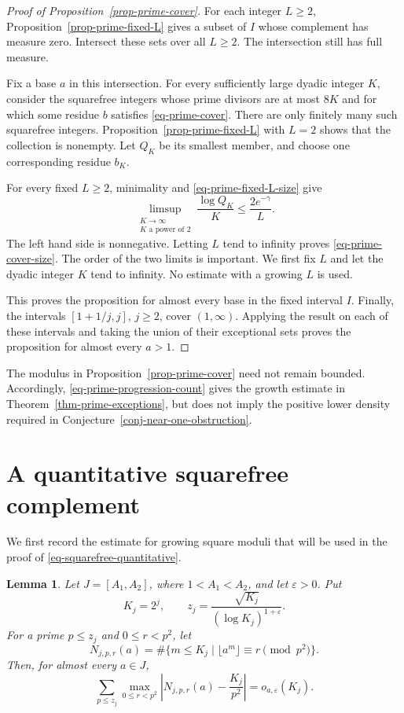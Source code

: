 \documentclass[11pt,reqno]{amsart}
\numberwithin{equation}{section}
\newtheorem{lemma}[theorem]{Lemma}
\begin{document}
\begin{proof}[Proof of Proposition~\ref{prop-prime-cover}]
For each integer $L\ge2$, Proposition~\ref{prop-prime-fixed-L} gives a subset of $I$ whose complement has measure zero. Intersect these sets over all $L\ge2$. The intersection still has full measure.

Fix a base $a$ in this intersection. For every sufficiently large dyadic integer $K$, consider the squarefree integers whose prime divisors are at most $8K$ and for which some residue $b$ satisfies \eqref{eq-prime-cover}. There are only finitely many such squarefree integers. Proposition~\ref{prop-prime-fixed-L} with $L=2$ shows that the collection is nonempty. Let $Q_K$ be its smallest member, and choose one corresponding residue $b_K$.

For every fixed $L\ge2$, minimality and \eqref{eq-prime-fixed-L-size} give
\[
 \limsup_{\substack{K\to\infty\\K\text{ a power of }2}}
 \frac{\log Q_K}{K}
 \le\frac{2e^{-\gamma}}L.
\]
The left hand side is nonnegative. Letting $L$ tend to infinity proves \eqref{eq-prime-cover-size}. The order of the two limits is important. We first fix $L$ and let the dyadic integer $K$ tend to infinity. No estimate with a growing $L$ is used.

This proves the proposition for almost every base in the fixed interval $I$. Finally, the intervals $[1+1/j,j]$, $j\ge2$, cover $(1,\infty)$. Applying the result on each of these intervals and taking the union of their exceptional sets proves the proposition for almost every $a>1$.
\end{proof}

The modulus in Proposition~\ref{prop-prime-cover} need not remain bounded. Accordingly, \eqref{eq-prime-progression-count} gives the growth estimate in Theorem~\ref{thm-prime-exceptions}, but does not imply the positive lower density required in Conjecture~\ref{conj-near-one-obstruction}.

\section{A quantitative squarefree complement}\label{sec-squarefree-proof}

    We first record the estimate for growing square moduli that will be used in the proof of \eqref{eq-squarefree-quantitative}.

    \begin{lemma}\label{lem-growing-squares}
        Let $J=[A_1,A_2]$, where $1<A_1<A_2$, and let $\varepsilon>0$. Put
        $$
        K_j=2^j,
        \qquad
        z_j=\frac{\sqrt{K_j}}{(\log K_j)^{1+\varepsilon}}.
        $$
        For a prime $p\le z_j$ and $0\le r<p^2$, let
        $$
        N_{j,p,r}(a)
        =\#\{m\le K_j\mid \lfloor a^m\rfloor\equiv r\pmod{p^2}\}.
        $$
        Then, for almost every $a\in J$,
        \begin{equation}\label{eq-growing-square-discrepancy}
            \sum_{p\le z_j}
            \max_{0\le r<p^2}
            \left|N_{j,p,r}(a)-\frac{K_j}{p^2}\right|
            =o_{a,\varepsilon}(K_j).
        \end{equation}
    \end{lemma}
\end{document}
